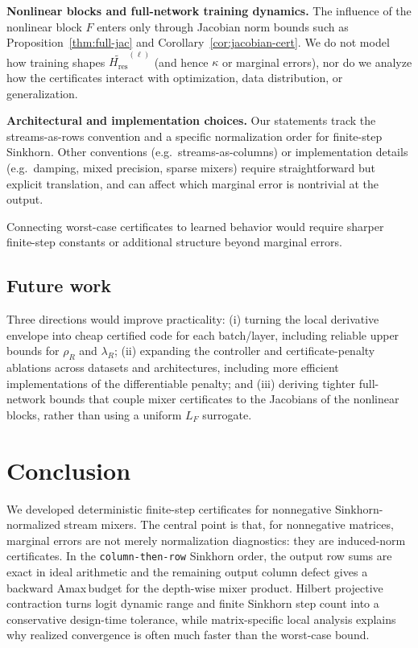 \documentclass[11pt]{article}
\numberwithin{equation}{section}
\theoremstyle{plain}
\theoremstyle{definition}
\theoremstyle{remark}
\newcommand{\Hres}{H_{\mathrm{res}}}
\newcommand{\Amax}{\textsf{Amax}\,}
\begin{document}
\noindent\textbf{Nonlinear blocks and full-network training dynamics.}
The influence of the nonlinear block $F$ enters only through Jacobian norm bounds such as Proposition~\ref{thm:full-jac} and Corollary~\ref{cor:jacobian-cert}.
We do not model how training shapes $\widetilde{\Hres}^{(\ell)}$ (and hence $\kappa$ or marginal errors), nor do we analyze how
the certificates interact with optimization, data distribution, or generalization.

\noindent\textbf{Architectural and implementation choices.}
Our statements track the streams-as-rows convention and a specific normalization order for finite-step Sinkhorn. Other conventions
(e.g.\ streams-as-columns) or implementation details (e.g.\ damping, mixed precision, sparse mixers) require straightforward but
explicit translation, and can affect which marginal error is nontrivial at the output.

Connecting worst-case certificates to learned behavior would require sharper finite-step constants or additional structure beyond marginal errors.

\subsection{Future work}\label{subsec:future_work}
Three directions would improve practicality: (i) turning the local derivative envelope into cheap certified code for each batch/layer, including reliable upper bounds for $\rho_R$ and $\lambda_R$; (ii) expanding the controller and certificate-penalty ablations across datasets and architectures, including more efficient implementations of the differentiable penalty; and (iii) deriving tighter full-network bounds that couple mixer certificates to the Jacobians of the nonlinear blocks, rather than using a uniform $L_F$ surrogate.





\section{Conclusion}\label{sec:conclusion}

We developed deterministic finite-step certificates for nonnegative
Sinkhorn-normalized stream mixers.  The central point is that, for nonnegative
matrices, marginal errors are not merely normalization diagnostics: they are
induced-norm certificates.  In the \texttt{column-then-row} Sinkhorn order, the
output row sums are exact in ideal arithmetic and the remaining output column
defect gives a backward \Amax budget for the depth-wise mixer product.  Hilbert
projective contraction turns logit dynamic range and finite Sinkhorn step count
into a conservative design-time tolerance, while matrix-specific local analysis
explains why realized convergence is often much faster than the worst-case
bound.
\end{document}
